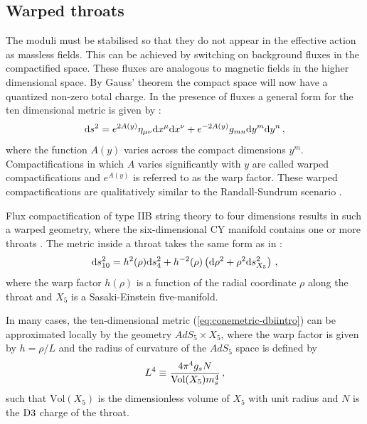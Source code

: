 \subsection{Warped throats}
\label{sec:warpedthroats-dbiintro}
The moduli must
be stabilised so that they do not appear in the effective action as
massless fields. This can be achieved by switching on background fluxes in the
compactified space. These fluxes are analogous to magnetic
fields in the higher dimensional space. By Gauss' theorem  the compact space
will now have a quantized non-zero total charge.
In the presence of fluxes a general form for the ten dimensional metric is given by
\cite{Baumann:2009ni}:
\begin{equation}
\label{eq:warpedmetric-dbiintro}
 \mathrm{d} s^2 = e^{2A(y)}\eta_{\mu\nu} \mathrm{d} x^\mu \mathrm{d} x^\nu + e^{-2A(y)} g_{mn}\mathrm{d} y^m
\mathrm{d} y^n\,,
\end{equation}
where the function $A(y)$ varies across the compact dimensions $y^m$.
Compactifications in which $A$ varies significantly with $y$ are called warped
compactifications and $e^{A(y)}$ is referred to as the warp factor. These warped
compactifications are qualitatively similar to
the Randall-Sundrum scenario \cite{Randall1999,Brummer2006}.


Flux compactification of type IIB string theory to four dimensions 
results in such a warped geometry, where the six-dimensional CY  
manifold contains one or more throats \cite{douglas,gkp,grana}. 
The metric inside a throat takes the same form as in
:
% 
\begin{equation}
\label{eq:conemetric-dbiintro}
\mathrm{d} s_{10}^2= h^2 ( \rho) \mathrm{d} s_4^2 + h^{-2} (\rho ) 
\left( \mathrm{d}\rho^2 +\rho^2 \mathrm{d} s_{X_5}^2 \right) \,,
\end{equation}
%  
where the warp factor $h (\rho)$ is a function of the 
radial coordinate $\rho$ along the throat and $X_5$
is a Sasaki-Einstein five-manifold. 


In many cases, the ten-dimensional metric (\ref{eq:conemetric-dbiintro}) can be 
approximated locally by the geometry $AdS_5 \times X_5$, where the 
warp factor is given by $h=\rho /L$ and 
the radius of curvature of the $AdS_5$ space is defined by
%  
\begin{equation}
L^4 \equiv \frac{4\pi^4 g_s N}{{\rm Vol} (X_5) m_s^4} \,,
\end{equation}
% 
such that $\mathrm{Vol}(X_5)$ is the dimensionless volume of 
$X_5$ with unit radius and $N$ is the ${\rm D3}$  charge of the throat.


